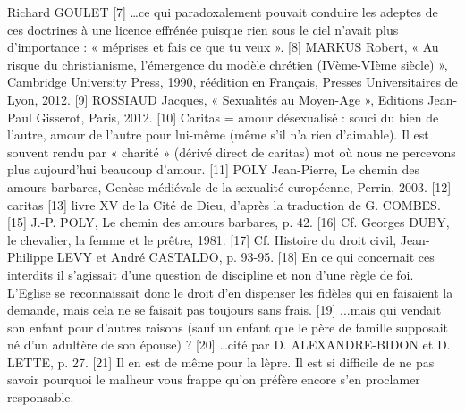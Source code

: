 Richard GOULET
[7] …ce qui paradoxalement pouvait conduire les adeptes de ces doctrines à une licence effrénée puisque rien sous le ciel n'avait plus d'importance : « méprises et fais ce que tu veux ».
[8] MARKUS Robert, « Au risque du christianisme, l'émergence du modèle chrétien (IVème-VIème siècle) », Cambridge University Press, 1990, réédition en Français, Presses Universitaires de Lyon, 2012.
[9] ROSSIAUD Jacques, « Sexualités au Moyen-Age », Editions Jean-Paul Gisserot, Paris, 2012.
[10] Caritas = amour désexualisé : souci du bien de l'autre, amour de l'autre pour lui-même (même s'il n'a rien d'aimable). Il est souvent rendu par « charité » (dérivé direct de caritas) mot où nous ne percevons plus aujourd'hui beaucoup d'amour.
[11] POLY Jean-Pierre, Le chemin des amours barbares, Genèse médiévale de la sexualité européenne, Perrin, 2003. 
[12] caritas
[13] livre XV de la Cité de Dieu, d'après la traduction de G. COMBES. 
[15] J.-P. POLY, Le chemin des amours barbares, p. 42.
[16] Cf. Georges DUBY, le chevalier, la femme et le prêtre, 1981.
[17] Cf. Histoire du droit civil, Jean-Philippe LEVY et André CASTALDO, p. 93-95.
[18] En ce qui concernait ces interdits il s'agissait d'une question de discipline et non d'une règle de foi. L'Eglise se reconnaissait donc le droit d'en dispenser les fidèles qui en faisaient la demande, mais cela ne se faisait pas toujours sans frais.
[19] ...mais qui vendait son enfant pour d'autres raisons (sauf un enfant que le père de famille supposait né d'un adultère de son épouse) ?
[20] …cité par D. ALEXANDRE-BIDON et D. LETTE, p. 27.
[21] Il en est de même pour la lèpre. Il est si difficile de ne pas savoir pourquoi le malheur vous frappe qu'on préfère encore s'en proclamer responsable.